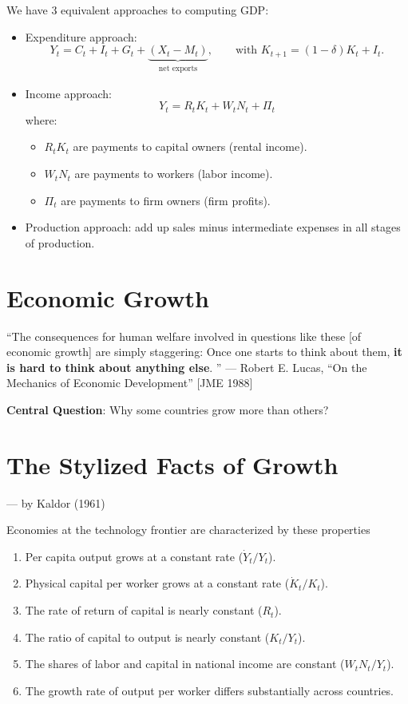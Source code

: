 
We have 3 equivalent approaches to computing GDP: \begin{itemize}
    \item Expenditure approach: \[
              Y_t = C_t + I_t + G_t + \underbrace{(X_t - M_t)}_{\substack{\text{net exports}}}, \qquad\text{with } K_{t+1} = (1-\delta)K_t + I_t.
          \]
    \item Income approach: \[
              Y_t = R_tK_t+W_tN_t+\Pi_t
          \]
          where: \begin{itemize}
              \item $R_tK_t$ are payments to capital owners (rental income).
              \item $W_tN_t$ are payments to workers (labor income).
              \item $\Pi_t$ are payments to firm owners (firm profits).
          \end{itemize}
    \item Production approach: add up sales minus intermediate expenses in all stages of production.
\end{itemize}

\section{Economic Growth}

``The consequences for human welfare involved in questions like these [of economic growth] are simply staggering: Once one starts to think about them, \textbf{it is hard to think about anything else}. '' --- Robert E. Lucas, “On the Mechanics of Economic Development” [JME 1988]

\textbf{Central Question}: Why some countries grow more than others?

\section{The Stylized Facts of Growth} --- by Kaldor (1961)

Economies at the technology frontier are characterized by these properties \begin{enumerate}
    \item Per capita output grows at a constant rate ($\dot{Y}_t/Y_t$).
    \item Physical capital per worker grows at a constant rate ($\dot{K}_t/K_t$).
    \item The rate of return of capital is nearly constant ($R_t$).
    \item The ratio of capital to output is nearly constant ($K_t/Y_t$).
    \item The shares of labor and capital in national income are constant ($W_tN_t/Y_t$).
    \item The growth rate of output per worker differs substantially across countries.
\end{enumerate}

